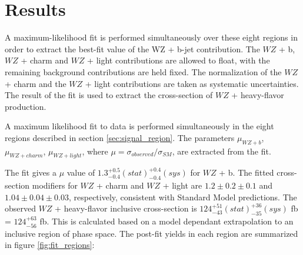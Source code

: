\documentclass[NOTE, atlasdraft=true, texlive=2016, UKenglish]{\ATLASLATEXPATH atlasdoc}
\begin{document}
                                                                
\section{Results}
\label{sec:results}

A maximum-likelihood fit is performed simultaneously over these eight regions in order to extract the best-fit value of the WZ + b-jet contribution. The $WZ$ + b, $WZ$ + charm and $WZ$ + light contributions are allowed to float, with the remaining background contributions are held fixed. The normalization of the $WZ$ + charm and the $WZ$ + light contributions are taken as systematic uncertainties. The result of the fit is used to extract the cross-section of $WZ$ + heavy-flavor production.

A maximum likelihood fit to data is performed simultaneously in the eight regions described in section \ref{sec:signal_region}. The parameters $\mu_{WZ+b}$, $\mu_{WZ+charm}$, $\mu_{WZ+light}$, where $\mu = \sigma_{observed}/\sigma_{SM} $, are extracted from the fit.

The fit gives a $\mu$ value of $1.3^{+0.5}_{-0.4}(stat)^{+0.4}_{-0.4}(sys)$ for $WZ$ + b. The fitted cross-section modifiers for $WZ$ + charm and $WZ$ + light are $1.2 \pm 0.2 \pm 0.1$ and $1.04 \pm 0.04 \pm 0.03 $, respectively, consistent with Standard Model predictions. The observed $WZ$ + heavy-flavor inclusive cross-section is $124^{+51}_{-43}(stat)^{+36}_{-35}(sys)$ fb = $124^{+63}_{-56}$ fb. This is calculated based on a model dependant extrapolation to an inclusive region of phase space. The post-fit yields in each region are summarized in figure \ref{fig:fit_regions}:
\end{document}
